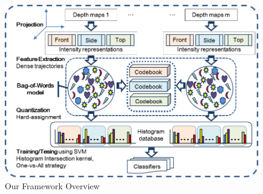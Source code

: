 \documentclass[review]{elsarticle}
\begin{document}
\begin{figure}
	\centering
		\includegraphics[width=\textwidth]{Framework3D.png} %
	\caption{\label{lbl:Figure_Framework}Our Framework Overview}
\end{figure}

\end{document}
